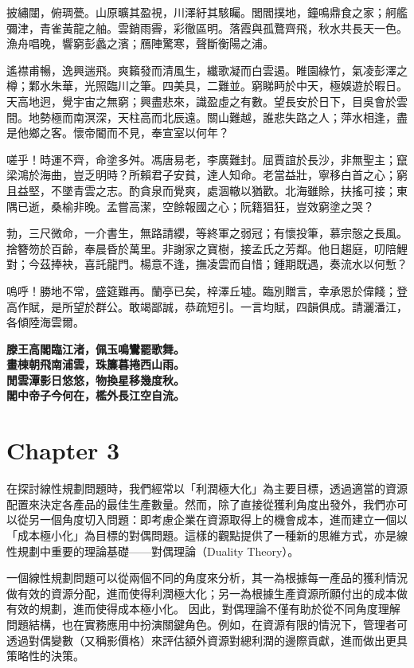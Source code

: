 \documentclass[12pt,a4paper,oneside]{report}
\begin{document}
披繡闥，俯琱甍。山原曠其盈視，川澤紆其駭矚。閭閻撲地，鐘鳴鼎食之家；舸艦彌津，青雀黃龍之舳。雲銷雨霽，彩徹區明。落霞與孤鶩齊飛，秋水共長天一色。漁舟唱晚，響窮彭蠡之濱；鴈陣驚寒，聲斷衡陽之浦。

遙襟甫暢，逸興遄飛。爽籟發而清風生，纖歌凝而白雲遏。睢園綠竹，氣凌彭澤之樽；鄴水朱華，光照臨川之筆。四美具，二難並。窮睇眄於中天，極娛遊於暇日。天高地迥，覺宇宙之無窮；興盡悲來，識盈虛之有數。望長安於日下，目吳會於雲間。地勢極而南溟深，天柱高而北辰遠。關山難越，誰悲失路之人；萍水相逢，盡是他鄉之客。懷帝閽而不見，奉宣室以何年？

嗟乎！時運不齊，命塗多舛。馮唐易老，李廣難封。屈賈誼於長沙，非無聖主；竄梁鴻於海曲，豈乏明時？所賴君子安貧，達人知命。老當益壯，寧移白首之心；窮且益堅，不墜青雲之志。酌貪泉而覺爽，處涸轍以猶歡。北海雖賒，扶搖可接；東隅已逝，桑榆非晚。孟嘗高潔，空餘報國之心；阮籍猖狂，豈效窮塗之哭？

勃，三尺微命，一介書生，無路請纓，等終軍之弱冠；有懷投筆，慕宗慤之長風。捨簪笏於百齡，奉晨昏於萬里。非謝家之寶樹，接孟氏之芳鄰。他日趨庭，叨陪鯉對；今茲捧袂，喜託龍門。楊意不逢，撫凌雲而自惜；鍾期既遇，奏流水以何慙？

嗚呼！勝地不常，盛筵難再。蘭亭已矣，梓澤丘墟。臨別贈言，幸承恩於偉餞；登高作賦，是所望於群公。敢竭鄙誠，恭疏短引。一言均賦，四韻俱成。請灑潘江，各傾陸海雲爾。

\begin{center}
    \bfseries
    滕王高閣臨江渚，佩玉鳴鸞罷歌舞。\\
    畫棟朝飛南浦雲，珠簾暮捲西山雨。\\
    閒雲潭影日悠悠，物換星移幾度秋。\\
    閣中帝子今何在，檻外長江空自流。
\end{center}

\chapter{Chapter 3}

在探討線性規劃問題時，我們經常以「利潤極大化」為主要目標，透過適當的資源配置來決定各產品的最佳生產數量。然而，除了直接從獲利角度出發外，我們亦可以從另一個角度切入問題：即考慮企業在資源取得上的機會成本，進而建立一個以「成本極小化」為目標的對偶問題。這樣的觀點提供了一種新的思維方式，亦是線性規劃中重要的理論基礎——對偶理論（Duality Theory）。

一個線性規劃問題可以從兩個不同的角度來分析，其一為根據每一產品的獲利情況做有效的資源分配，進而使得利潤極大化；另一為根據生產資源所願付出的成本做有效的規劃，進而使得成本極小化。 因此，對偶理論不僅有助於從不同角度理解問題結構，也在實務應用中扮演關鍵角色。例如，在資源有限的情況下，管理者可透過對偶變數（又稱影價格）來評估額外資源對總利潤的邊際貢獻，進而做出更具策略性的決策。%
\end{document}

